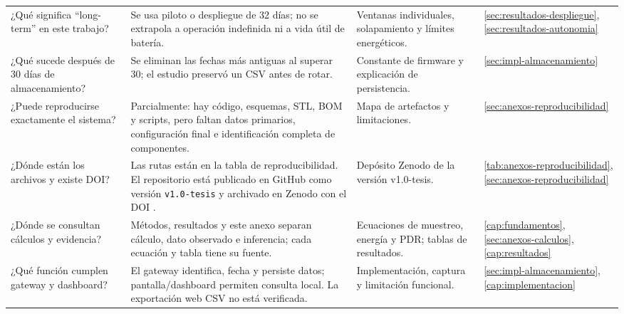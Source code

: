 \begin{longtable}{@{}>{\raggedright\arraybackslash}p{3.15cm}>{\raggedright\arraybackslash}p{4.25cm}>{\raggedright\arraybackslash}p{4.35cm}>{\raggedright\arraybackslash}p{2.65cm}@{}}
¿Qué significa “long-term” en este trabajo? & Se usa piloto o despliegue de 32 días; no se extrapola a operación indefinida ni a vida útil de batería. & Ventanas individuales, solapamiento y límites energéticos. & \ref{sec:resultados-despliegue}, \ref{sec:resultados-autonomia} \\
¿Qué sucede después de 30 días de almacenamiento? & Se eliminan las fechas más antiguas al superar 30; el estudio preservó un CSV antes de rotar. & Constante de firmware y explicación de persistencia. & \ref{sec:impl-almacenamiento} \\
¿Puede reproducirse exactamente el sistema? & Parcialmente: hay código, esquemas, STL, BOM y scripts, pero faltan datos primarios, configuración final e identificación completa de componentes. & Mapa de artefactos y limitaciones. & \ref{sec:anexos-reproducibilidad} \\
¿Dónde están los archivos y existe DOI? & Las rutas están en la tabla de reproducibilidad. El repositorio está publicado en GitHub como versión \texttt{v1.0-tesis} y archivado en Zenodo con el DOI \DOIZenodo{}. & Depósito Zenodo de la versión v1.0-tesis. & \ref{tab:anexos-reproducibilidad}, \ref{sec:anexos-reproducibilidad} \\
¿Dónde se consultan cálculos y evidencia? & Métodos, resultados y este anexo separan cálculo, dato observado e inferencia; cada ecuación y tabla tiene su fuente. & Ecuaciones de muestreo, energía y PDR; tablas de resultados. & \ref{cap:fundamentos}, \ref{sec:anexos-calculos}, \ref{cap:resultados} \\
¿Qué función cumplen gateway y dashboard? & El gateway identifica, fecha y persiste datos; pantalla/dashboard permiten consulta local. La exportación web CSV no está verificada. & Implementación, captura y limitación funcional. & \ref{sec:impl-almacenamiento}, \ref{cap:implementacion} \\
\end{longtable}
\endgroup
